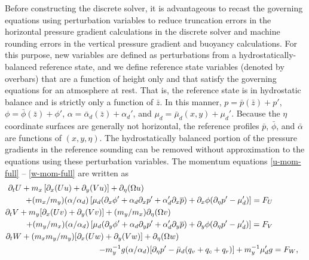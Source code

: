 Before constructing the discrete solver, it is advantageous to recast
the governing equations using perturbation variables to reduce
truncation errors in the horizontal pressure gradient calculations in
the discrete solver and machine rounding errors in
the vertical pressure gradient and buoyancy calculations.  
For this purpose, new
variables are defined as perturbations from a hydrostatically-balanced 
reference state, and we define reference state
variables (denoted by overbars) that are a function of height only and
that satisfy the governing equations for an atmosphere at rest.  That is,
the reference state is in hydrostatic balance and is strictly only a
function of $\bar z$.  In this manner, $p=\bar p(\bar z)+p'$, $\phi=\bar
\phi(\bar z)
+\phi'$, $\alpha=\bar \alpha_d(\bar z) +\alpha_d'$, and $\mu_d = \bar\mu_d(x,y) +
\mu_d'$. Because the $\eta$ coordinate surfaces are generally not
horizontal, the reference profiles $\bar p$, $\bar\phi$, and
$\bar\alpha$ are functions of $(x,y,\eta)$. 
The hydrostatically balanced portion of the pressure gradients in the
reference sounding can be removed without approximation to the equations
using these perturbation variables.
The momentum equations 
\eqref{u-mom-full} -- \eqref{w-mom-full} are written as
%
\begin{align}
\partial_t U + m_x\left[\partial_x(Uu) + \partial_y(Vu)\right] + \partial_\eta (\Omega u) ~~~~~~~~ ~~~~~~~~ ~~~~~~~~ ~~~~~~~~ ~~~~~~~ ~~~~~~~ ~~ \notag &
\hphantom{(m_y/m_x)}
\\
+(m_x/m_y) (\alpha/\alpha_d) \left[ \mu_d (\partial_x \phi' + \alpha_d \partial_x p' + \alpha'_d \partial_x \overline{p}) +
\partial_x \phi (\partial_\eta p' - \mu'_d)\right]  = F_U
\label{u-mom-pert}
\\
%
\partial_t V + m_y[\partial_x (Uv) + \partial_y (Vv)] + (m_y/m_x) \partial_\eta (\Omega v) ~~~~~~~~ ~~~~~~~~ ~~~~~~~~ ~~~~~~~~ ~~~~~~ \notag &
\\
+(m_y/m_x) (\alpha/\alpha_d) \left[ \mu_d (\partial_y \phi' + \alpha_d \partial_y p' + \alpha'_d \partial_y \overline{p}) +
\partial_y \phi (\partial_\eta p' - \mu'_d)\right]  = F_V
\\
%
\partial_t W  + (m_x m_y/m_y) [\partial_x (Uw) + \partial_y (Vw)] + \partial_\eta
(\Omega w)  ~~~~~~~~ ~~~~~~~~ ~~~~~~~~ ~~~~~~~~ ~~~ \notag & 
\\
- m_y^{-1} g (\alpha/\alpha_d) [\partial_\eta p' 
- {\bar{\mu}}_d (q_v + q_c +q_r)]
+ m_y^{-1} {\mu}_d'g
&= F_W,
\label{w-mom-pert}
\end{align}
